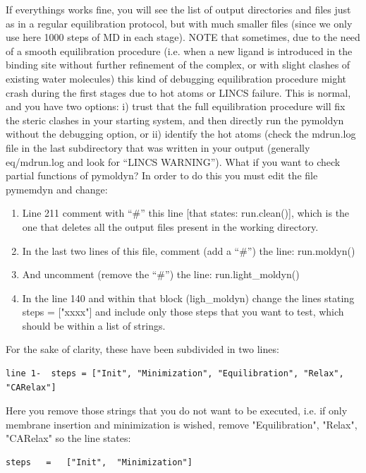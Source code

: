 \documentclass[10pt, oneside, pdftex]{article}
\begin{document}
If everythings works fine, you will see the list of output directories
and files just  as in a regular equilibration  protocol, but with much
smaller files (since we only use here 1000 steps of MD in each stage).
NOTE  that  sometimes, due  to  the  need  of a  smooth  equilibration
procedure (i.e.  when a new ligand  is introduced in  the binding site
without further refinement  of the complex, or with  slight clashes of
existing  water  molecules)   this  kind  of  debugging  equilibration
procedure  might crash during  the first  stages due  to hot  atoms or
LINCS failure. This is normal, and you have two options: i) trust that
the full equilibration  procedure will fix the steric  clashes in your
starting  system,  and then  directly  run  the  pymoldyn without  the
debugging option, or  ii) identify the hot atoms  (check the mdrun.log
file  in  the  last  subdirectory  that was  written  in  your  output
(generally eq/mdrun.log  and look for  ``LINCS WARNING'').  What  if you
want to check partial functions of  pymoldyn?  In order to do this you
must edit  the file pymemdyn  and change: 
\begin{enumerate}
\item{Line 211 comment  with ``\#''
this line  [that states: run.clean()],  which is the one  that deletes
all the output files present in the working directory.}
\item{In the  last two  lines of  this file, comment  (add a ``\#'') the
  line: run.moldyn()}
\item{And uncomment (remove the ``\#'') the line: run.light\_moldyn()}
\item{In the line  140 and within that block  (ligh\_moldyn) change the
  lines stating steps = ["xxxx"] and include only those steps that you
  want to test, which should be within a list of strings.}
\end{enumerate}

For the  sake of clarity,  these have been  subdivided in  two lines:  

\begin{Verbatim}
line 1-  steps = ["Init", "Minimization", "Equilibration", "Relax", "CARelax"] 
\end{Verbatim}
Here you remove those strings that you do not want to be executed, i.e. if only
membrane insertion and minimization is wished, remove "Equilibration",
"Relax",   "CARelax"   so   the   line  states:   
\begin{Verbatim}
steps   =   ["Init",  "Minimization"]  
\end{Verbatim}
\end{document}
